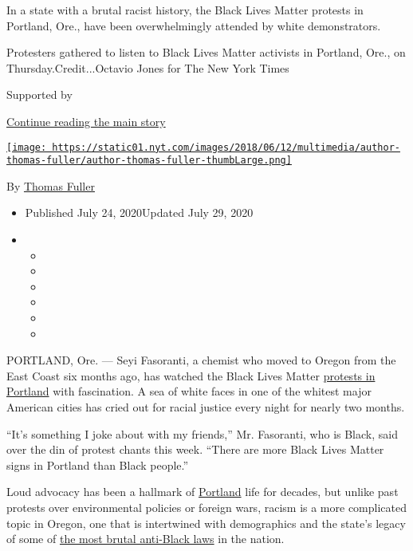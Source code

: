 In a state with a brutal racist history, the Black Lives Matter protests
in Portland, Ore., have been overwhelmingly attended by white
demonstrators.

Protesters gathered to listen to Black Lives Matter activists in
Portland, Ore., on Thursday.Credit...Octavio Jones for The New York
Times

Supported by

\protect\hyperlink{after-sponsor}{Continue reading the main story}

\href{https://www.nytimes.com/by/thomas-fuller}{\texttt{[image: https://static01.nyt.com/images/2018/06/12/multimedia/author-thomas-fuller/author-thomas-fuller-thumbLarge.png]}}

By \href{https://www.nytimes.com/by/thomas-fuller}{Thomas Fuller}

\begin{itemize}
\item
  Published July 24, 2020Updated July 29, 2020
\item
  \begin{itemize}
  \item
  \item
  \item
  \item
  \item
  \item
  \end{itemize}
\end{itemize}

PORTLAND, Ore. --- Seyi Fasoranti, a chemist who moved to Oregon from
the East Coast six months ago, has watched the Black Lives Matter
\href{https://www.nytimes.com/2020/07/29/us/protests-portland-federal-withdrawal.html}{protests
in Portland} with fascination. A sea of white faces in one of the
whitest major American cities has cried out for racial justice every
night for nearly two months.

``It's something I joke about with my friends,'' Mr. Fasoranti, who is
Black, said over the din of protest chants this week. ``There are more
Black Lives Matter signs in Portland than Black people.''

Loud advocacy has been a hallmark of
\href{https://www.nytimes.com/2020/07/25/us/a-wall-of-vets-joins-the-front-lines-of-portland-protests.html}{Portland}
life for decades, but unlike past protests over environmental policies
or foreign wars, racism is a more complicated topic in Oregon, one that
is intertwined with demographics and the state's legacy of some of
\href{https://www.nytimes.com/2017/06/04/us/portland-killings-racist-laws-oregon.html}{the
most brutal anti-Black laws} in the nation.

